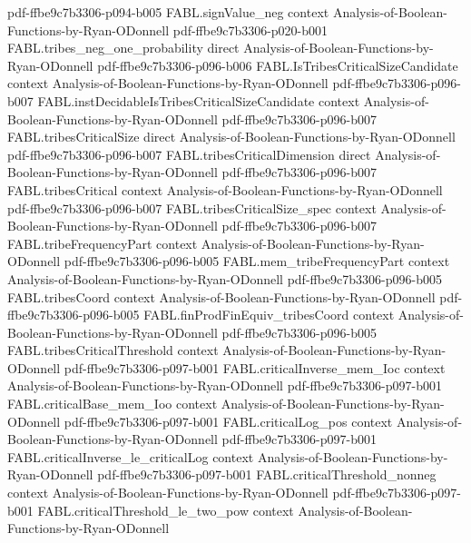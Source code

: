 \begin{theorem}
  {pdf-ffbe9c7b3306-p094-b005}
\proofstep
  {FABL.signValue_neg}
  {context}
  {Analysis-of-Boolean-Functions-by-Ryan-ODonnell}
  {pdf-ffbe9c7b3306-p020-b001}
\proofstep
  {FABL.tribes_neg_one_probability}
  {direct}
  {Analysis-of-Boolean-Functions-by-Ryan-ODonnell}
  {pdf-ffbe9c7b3306-p096-b006}
\proofstep
  {FABL.IsTribesCriticalSizeCandidate}
  {context}
  {Analysis-of-Boolean-Functions-by-Ryan-ODonnell}
  {pdf-ffbe9c7b3306-p096-b007}
\proofstep
  {FABL.instDecidableIsTribesCriticalSizeCandidate}
  {context}
  {Analysis-of-Boolean-Functions-by-Ryan-ODonnell}
  {pdf-ffbe9c7b3306-p096-b007}
\proofstep
  {FABL.tribesCriticalSize}
  {direct}
  {Analysis-of-Boolean-Functions-by-Ryan-ODonnell}
  {pdf-ffbe9c7b3306-p096-b007}
\proofstep
  {FABL.tribesCriticalDimension}
  {direct}
  {Analysis-of-Boolean-Functions-by-Ryan-ODonnell}
  {pdf-ffbe9c7b3306-p096-b007}
\proofstep
  {FABL.tribesCritical}
  {context}
  {Analysis-of-Boolean-Functions-by-Ryan-ODonnell}
  {pdf-ffbe9c7b3306-p096-b007}
\proofstep
  {FABL.tribesCriticalSize_spec}
  {context}
  {Analysis-of-Boolean-Functions-by-Ryan-ODonnell}
  {pdf-ffbe9c7b3306-p096-b007}
\proofstep
  {FABL.tribeFrequencyPart}
  {context}
  {Analysis-of-Boolean-Functions-by-Ryan-ODonnell}
  {pdf-ffbe9c7b3306-p096-b005}
\proofstep
  {FABL.mem_tribeFrequencyPart}
  {context}
  {Analysis-of-Boolean-Functions-by-Ryan-ODonnell}
  {pdf-ffbe9c7b3306-p096-b005}
\proofstep
  {FABL.tribesCoord}
  {context}
  {Analysis-of-Boolean-Functions-by-Ryan-ODonnell}
  {pdf-ffbe9c7b3306-p096-b005}
\proofstep
  {FABL.finProdFinEquiv_tribesCoord}
  {context}
  {Analysis-of-Boolean-Functions-by-Ryan-ODonnell}
  {pdf-ffbe9c7b3306-p096-b005}
\proofstep
  {FABL.tribesCriticalThreshold}
  {context}
  {Analysis-of-Boolean-Functions-by-Ryan-ODonnell}
  {pdf-ffbe9c7b3306-p097-b001}
\proofstep
  {FABL.criticalInverse_mem_Ioc}
  {context}
  {Analysis-of-Boolean-Functions-by-Ryan-ODonnell}
  {pdf-ffbe9c7b3306-p097-b001}
\proofstep
  {FABL.criticalBase_mem_Ioo}
  {context}
  {Analysis-of-Boolean-Functions-by-Ryan-ODonnell}
  {pdf-ffbe9c7b3306-p097-b001}
\proofstep
  {FABL.criticalLog_pos}
  {context}
  {Analysis-of-Boolean-Functions-by-Ryan-ODonnell}
  {pdf-ffbe9c7b3306-p097-b001}
\proofstep
  {FABL.criticalInverse_le_criticalLog}
  {context}
  {Analysis-of-Boolean-Functions-by-Ryan-ODonnell}
  {pdf-ffbe9c7b3306-p097-b001}
\proofstep
  {FABL.criticalThreshold_nonneg}
  {context}
  {Analysis-of-Boolean-Functions-by-Ryan-ODonnell}
  {pdf-ffbe9c7b3306-p097-b001}
\proofstep
  {FABL.criticalThreshold_le_two_pow}
  {context}
  {Analysis-of-Boolean-Functions-by-Ryan-ODonnell}

\end{theorem}
